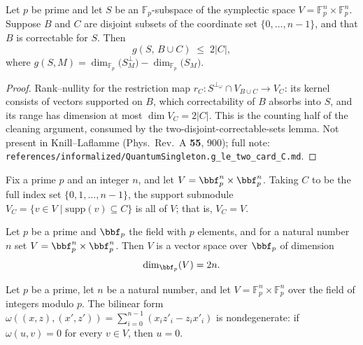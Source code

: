\begin{lemma}
\label{g_le_two_card_C}
\leanok
{}
Let $p$ be prime and let $S$ be an $\mathbb{F}_p$-subspace of the symplectic space $V =
\mathbb{F}_p^n \times \mathbb{F}_p^n$. Suppose $B$ and $C$ are disjoint subsets of the
coordinate set $\{0,\dots,n-1\}$, and that $B$ is correctable for $S$. Then
\[
g(S,\, B \cup C) \;\le\; 2\lvert C\rvert,
\]
where $g(S,M) = \dim_{\mathbb{F}_p}\!\bigl(S^{\perp}_M\bigr) -
\dim_{\mathbb{F}_p}\!\bigl(S_M\bigr)$.
\end{lemma}

\begin{proof}
\leanok
Rank--nullity for the restriction map
$r_C : S^{\perp_\omega} \cap V_{B \cup C} \to V_C$: its kernel consists of
vectors supported on $B$, which correctability of $B$ absorbs into $S$, and
its range has dimension at most $\dim V_C = 2|C|$.  This is the counting half
of the cleaning argument, consumed by the two-disjoint-correctable-sets
lemma.  Not present in Knill--Laflamme (Phys.\ Rev.\ A \textbf{55}, 900);
full note:
\texttt{references/informalized/QuantumSingleton.g\_le\_two\_card\_C.md}.
\end{proof}

\begin{lemma}
\label{V_sub_univ_eq_top}
\leanok
{}
Fix a prime $p$ and an integer $n$, and let $V = \bbf_p^n \times \bbf_p^n$. Taking $C$
to be the full index set $\{0,1,\dots,n-1\}$, the support submodule $V_C = \{v \in V
\mid \mathrm{supp}(v) \subseteq C\}$ is all of $V$; that is, $V_C = V$.
\end{lemma}

\begin{lemma}
\label{finrank_V}
\leanok
{}
Let $p$ be a prime and $\bbf_p$ the field with $p$ elements, and for a natural number
$n$ set $V = \bbf_p^n \times \bbf_p^n$. Then $V$ is a vector space over $\bbf_p$ of
dimension \[ \dim_{\bbf_p}(V) = 2n. \]
\end{lemma}

\begin{lemma}
\label{symB_nondegenerate}
\leanok
{}
Let $p$ be a prime, let $n$ be a natural number, and let
$V=\mathbb{F}_p^n\times\mathbb{F}_p^n$ over the field of integers modulo $p$. The
bilinear form $\omega((x,z),(x',z'))=\sum_{i=0}^{n-1}(x_i z'_i-z_i x'_i)$ is
nondegenerate: if $\omega(u,v)=0$ for every $v\in V$, then $u=0$.
\end{lemma}

